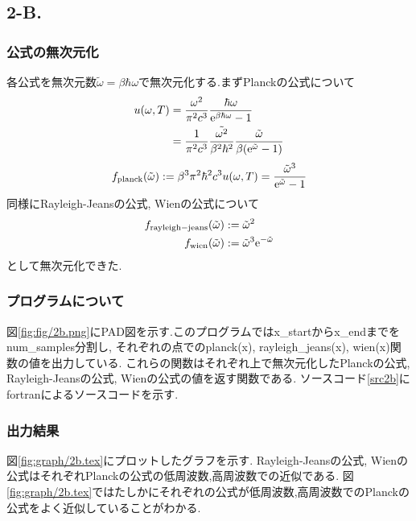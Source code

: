 \subsection*{2-B.}
\subsubsection*{公式の無次元化}
各公式を無次元数$\tilde{\omega}=\beta\hbar\omega$で無次元化する.まずPlanckの公式について
\begin{align*}
  u(\omega,T)&=\frac{\omega^2}{\pi^2c^3}\frac{\hbar\omega}{{\rm e}^{\beta\hbar\omega}-1}\\
  &=\frac{1}{\pi^2c^3}\frac{\tilde{\omega^2}}{\beta^2\hbar^2}\frac{\tilde{\omega}}{\beta({\rm e}^{\tilde{\omega}}-1)}\\
\end{align*}
\begin{align*}
  f_{\rm planck}(\tilde{\omega}):=\beta^3\pi^2\hbar^2c^3u(\omega,T)=\frac{\tilde{\omega}^3}{{\rm e}^{\tilde{\omega}}-1}
\end{align*}
同様にRayleigh-Jeansの公式, Wienの公式について
\begin{align*}
  f_{\rm rayleigh-jeans}(\tilde{\omega})&:=\tilde{\omega}^2\\
  f_{\rm wien}(\tilde{\omega})&:=\tilde{\omega}^3{\rm e}^{-\tilde{\omega}}
\end{align*}
として無次元化できた.
\subsubsection*{プログラムについて}
図\ref{fig:fig/2b.png}にPAD図を示す.このプログラムではx\_startからx\_endまでをnum\_samples分割し,
それぞれの点でのplanck(x), rayleigh\_jeans(x), wien(x)関数の値を出力している.
これらの関数はそれぞれ上で無次元化したPlanckの公式, Rayleigh-Jeansの公式, Wienの公式の値を返す関数である.
ソースコード\ref{src2b}にfortranによるソースコードを示す.
\clearpage
\subsubsection*{出力結果}
図\ref{fig:graph/2b.tex}にプロットしたグラフを示す.
Rayleigh-Jeansの公式, Wienの公式はそれぞれPlanckの公式の低周波数,高周波数での近似である.
図\ref{fig:graph/2b.tex}ではたしかにそれぞれの公式が低周波数,高周波数でのPlanckの公式をよく近似していることがわかる.
